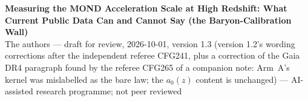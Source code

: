 \documentclass[10pt]{article}
\begin{document}
\begin{center}
{\Large\bfseries Measuring the MOND Acceleration Scale at High Redshift: What Current Public Data Can and Cannot Say (the Baryon-Calibration Wall)}\\[6pt]
{\small The authors --- draft for review, 2026-10-01, version 1.3 (version 1.2's wording corrections after the independent referee CFG241, plus a correction of the Gaia DR4 paragraph found by the referee CFG265 of a companion note: Arm~A's kernel was mislabelled as the bare law; the $a_0(z)$ content is unchanged) --- AI-assisted research programme; not peer reviewed}
\end{center}

\end{document}
